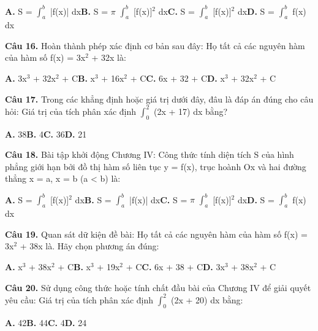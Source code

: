 \documentclass[11pt,a4paper]{article}
\begin{document}
\hspace*{1.5em}\textbf{A.} S = $\int_{a}^{b}$ |f(x)| dx\quad\quad \textbf{B.} S = $\pi$ $\int_{a}^{b}$ [f(x)]$^2$ dx\quad\quad \textbf{C.} S = $\int_{a}^{b}$ [f(x)]$^2$ dx\quad\quad \textbf{D.} S = $\int_{a}^{b}$ f(x) dx\par\vspace{2pt}
\textbf{\color{primary} Câu 16.} Hoàn thành phép xác định cơ bản sau đây: Họ tất cả các nguyên hàm của hàm số f(x) = 3x$^2$ + 32x là:\par
\hspace*{1.5em}\textbf{A.} 3x$^3$ + 32x$^2$ + C\quad\quad \textbf{B.} x$^3$ + 16x$^2$ + C\quad\quad \textbf{C.} 6x + 32 + C\quad\quad \textbf{D.} x$^3$ + 32x$^2$ + C\par\vspace{2pt}
\textbf{\color{primary} Câu 17.} Trong các khẳng định hoặc giá trị dưới đây, đâu là đáp án đúng cho câu hỏi: Giá trị của tích phân xác định $\int_{0}^{2}$ (2x + 17) dx bằng?\par
\hspace*{1.5em}\textbf{A.} 38\quad\quad \textbf{B.} 4\quad\quad \textbf{C.} 36\quad\quad \textbf{D.} 21\par\vspace{2pt}
\textbf{\color{primary} Câu 18.} Bài tập khởi động Chương IV: Công thức tính diện tích S của hình phẳng giới hạn bởi đồ thị hàm số liên tục y = f(x), trục hoành Ox và hai đường thẳng x = a, x = b (a < b) là:\par
\hspace*{1.5em}\textbf{A.} S = $\int_{a}^{b}$ [f(x)]$^2$ dx\quad\quad \textbf{B.} S = $\int_{a}^{b}$ |f(x)| dx\quad\quad \textbf{C.} S = $\pi$ $\int_{a}^{b}$ [f(x)]$^2$ dx\quad\quad \textbf{D.} S = $\int_{a}^{b}$ f(x) dx\par\vspace{2pt}
\textbf{\color{primary} Câu 19.} Quan sát dữ kiện đề bài: Họ tất cả các nguyên hàm của hàm số f(x) = 3x$^2$ + 38x là. Hãy chọn phương án đúng:\par
\hspace*{1.5em}\textbf{A.} x$^3$ + 38x$^2$ + C\quad\quad \textbf{B.} x$^3$ + 19x$^2$ + C\quad\quad \textbf{C.} 6x + 38 + C\quad\quad \textbf{D.} 3x$^3$ + 38x$^2$ + C\par\vspace{2pt}
\textbf{\color{primary} Câu 20.} Sử dụng công thức hoặc tính chất đầu bài của Chương IV để giải quyết yêu cầu: Giá trị của tích phân xác định $\int_{0}^{2}$ (2x + 20) dx bằng:\par
\hspace*{1.5em}\textbf{A.} 42\quad\quad \textbf{B.} 44\quad\quad \textbf{C.} 4\quad\quad \textbf{D.} 24\par\vspace{2pt}
\end{document}
